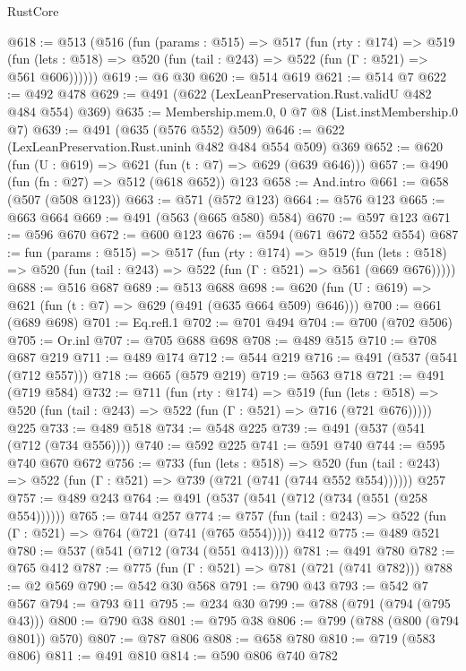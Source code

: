 \begin{lexlean}{RustCore}
\begin{coremodule}
@618 := @513
    (@516
      (fun (params : @515) =>
      @517
        (fun (rty : @174) =>
        @519
          (fun (lets : @518) => @520 (fun (tail : @243) => @522 (fun (Γ : @521) => @561 @606))))))
@619 := @6 @30
@620 := @514 @619
@621 := @514 @7
@622 := @492 @478
@629 := @491 (@622 (LexLeanPreservation.Rust.validU @482 @484 @554) @369)
@635 := Membership.mem.{0, 0} @7 @8 (List.instMembership.{0} @7)
@639 := @491 (@635 (@576 @552) @509)
@646 := @622 (LexLeanPreservation.Rust.uninh @482 @484 @554 @509) @369
@652 := @620 (fun (U : @619) => @621 (fun (t : @7) => @629 (@639 @646)))
@657 := @490 (fun (fn : @27) => @512 (@618 @652)) @123
@658 := And.intro
@661 := @658 (@507 (@508 @123))
@663 := @571 (@572 @123)
@664 := @576 @123
@665 := @663 @664
@669 := @491 (@563 (@665 @580) @584)
@670 := @597 @123
@671 := @596 @670
@672 := @600 @123
@676 := @594 (@671 @672 @552 @554)
@687 := fun (params : @515) =>
  @517
    (fun (rty : @174) =>
    @519
      (fun (lets : @518) => @520 (fun (tail : @243) => @522 (fun (Γ : @521) => @561 (@669 @676)))))
@688 := @516 @687
@689 := @513 @688
@698 := @620 (fun (U : @619) => @621 (fun (t : @7) => @629 (@491 (@635 @664 @509) @646)))
@700 := @661 (@689 @698)
@701 := Eq.refl.{1}
@702 := @701 @494
@704 := @700 (@702 @506)
@705 := Or.inl
@707 := @705 @688 @698
@708 := @489 @515
@710 := @708 @687 @219
@711 := @489 @174
@712 := @544 @219
@716 := @491 (@537 (@541 (@712 @557)))
@718 := @665 (@579 @219)
@719 := @563 @718
@721 := @491 (@719 @584)
@732 := @711
    (fun (rty : @174) =>
    @519
      (fun (lets : @518) => @520 (fun (tail : @243) => @522 (fun (Γ : @521) => @716 (@721 @676)))))
    @225
@733 := @489 @518
@734 := @548 @225
@739 := @491 (@537 (@541 (@712 (@734 @556))))
@740 := @592 @225
@741 := @591 @740
@744 := @595 @740 @670 @672
@756 := @733
    (fun (lets : @518) =>
    @520 (fun (tail : @243) => @522 (fun (Γ : @521) => @739 (@721 (@741 (@744 @552 @554))))))
    @257
@757 := @489 @243
@764 := @491 (@537 (@541 (@712 (@734 (@551 (@258 @554))))))
@765 := @744 @257
@774 := @757 (fun (tail : @243) => @522 (fun (Γ : @521) => @764 (@721 (@741 (@765 @554))))) @412
@775 := @489 @521
@780 := @537 (@541 (@712 (@734 (@551 @413))))
@781 := @491 @780
@782 := @765 @412
@787 := @775 (fun (Γ : @521) => @781 (@721 (@741 @782)))
@788 := @2 @569
@790 := @542 @30 @568
@791 := @790 @43
@793 := @542 @7 @567
@794 := @793 @11
@795 := @234 @30
@799 := @788 (@791 (@794 (@795 @43)))
@800 := @790 @38
@801 := @795 @38
@806 := @799 (@788 (@800 (@794 @801)) @570)
@807 := @787 @806
@808 := @658 @780
@810 := @719 (@583 @806)
@811 := @491 @810
@814 := @590 @806 @740 @782

\end{coremodule}
\end{lexlean}
